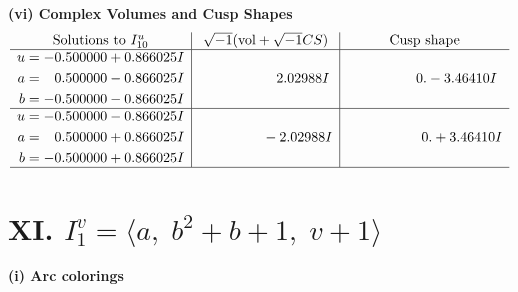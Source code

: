 \documentclass[1p]{elsarticle_modified}
\theoremstyle{definition}
\newcommand{\I}{\sqrt{-1}}
\begin{document}
\newpage\flushleft \textbf{(vi) Complex Volumes and Cusp Shapes}
$$\begin{array}{c|c|c}  
\text{Solutions to }I^u_{10}& \I (\text{vol} + \sqrt{-1}CS) & \text{Cusp shape}\\
 \hline 
\begin{aligned}
u &= -0.500000 + 0.866025 I \\
a &= \phantom{-}0.500000 - 0.866025 I \\
b &= -0.500000 - 0.866025 I\end{aligned}
 & \phantom{-0.000000 -}2.02988 I & \phantom{-0.000000 } 0. - 3.46410 I \\ \hline\begin{aligned}
u &= -0.500000 - 0.866025 I \\
a &= \phantom{-}0.500000 + 0.866025 I \\
b &= -0.500000 + 0.866025 I\end{aligned}
 & \phantom{-0.000000 } -2.02988 I & \phantom{-0.000000 -}0. + 3.46410 I\\
 \hline 
 \end{array}$$\newpage\newpage\renewcommand{\arraystretch}{1}
\centering \section*{XI. $I^v_{1}= \langle a,\;b^2+b+1,\;v+1 \rangle$}
\flushleft \textbf{(i) Arc colorings}\\
\end{document}
